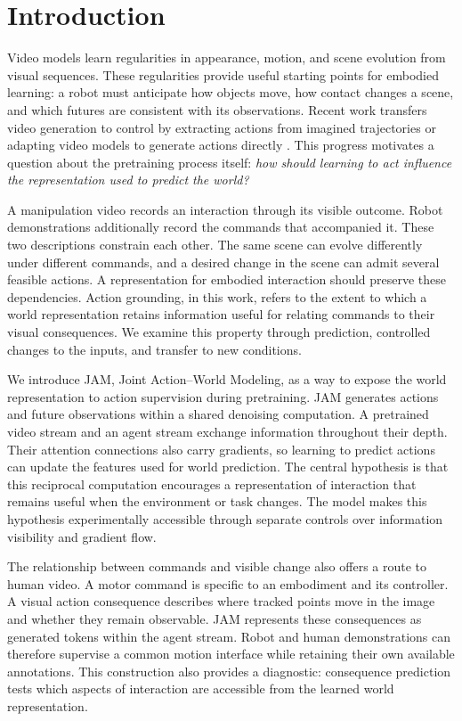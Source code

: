 \section{Introduction}
Video models learn regularities in appearance, motion, and scene evolution from visual sequences.
These regularities provide useful starting points for embodied learning: a robot must anticipate how
objects move, how contact changes a scene, and which futures are consistent with its observations.
Recent work transfers video generation to control by extracting actions from imagined trajectories
or adapting video models to generate actions directly \citep{unipi,cosmos}. This progress motivates
a question about the pretraining process itself: \emph{how should learning to act influence the
representation used to predict the world?}

A manipulation video records an interaction through its visible outcome. Robot demonstrations
additionally record the commands that accompanied it. These two descriptions constrain each other.
The same scene can evolve differently under different commands, and a desired change in the scene
can admit several feasible actions. A representation for embodied interaction should preserve these
dependencies. Action grounding, in this work, refers to the extent to which a world representation
retains information useful for relating commands to their visual consequences. We examine this
property through prediction, controlled changes to the inputs, and transfer to new conditions.

We introduce JAM, Joint Action--World Modeling, as a way to expose the world representation to
action supervision during pretraining. JAM generates actions and future observations within a shared
denoising computation. A pretrained video stream and an agent stream exchange information throughout
their depth. Their attention connections also carry gradients, so learning to predict actions can
update the features used for world prediction. The central hypothesis is that this reciprocal
computation encourages a representation of interaction that remains useful when the environment or
task changes. The model makes this hypothesis experimentally accessible through separate controls
over information visibility and gradient flow.

The relationship between commands and visible change also offers a route to human video. A motor
command is specific to an embodiment and its controller. A visual action consequence describes where
tracked points move in the image and whether they remain observable. JAM represents these
consequences as generated tokens within the agent stream. Robot and human demonstrations can
therefore supervise a common motion interface while retaining their own available annotations. This
construction also provides a diagnostic: consequence prediction tests which aspects of interaction
are accessible from the learned world representation.

